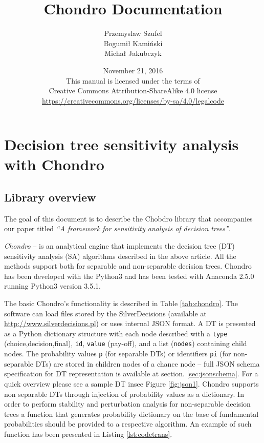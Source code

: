 \documentclass[a4paper,10pt,english]{sphinxmanual}
\title{Chondro Documentation}
\date{November 21, 2016
\\
This manual is licensed under the terms of\\Creative Commons Attribution-ShareAlike 4.0 license\\ \url{https://creativecommons.org/licenses/by-sa/4.0/legalcode}
}
\author{Przemyslaw Szufel \\ Bogumi{\l} Kami\'{n}ski \\ Micha{\l} Jakubczyk }
\begin{document}
	\lstset{language=Python}
	\maketitle

	
\chapter{Decision tree sensitivity analysis with Chondro}

\section{Library overview}
	The goal of this document is to describe the Chobdro library that accompanies our paper titled \emph{``A framework for sensitivity analysis of decision trees''}.

	\emph{Chondro} -- is an analytical engine that implements the decision tree (DT) sensitivity analysis (SA) algorithms described in the above article. All the methods support both for separable and non-separable decision trees. Chondro has been developed with the Python3 and has been tested with Anaconda 2.5.0 running Python3 version 3.5.1. 
	
	The basic Chondro's functionality is described in Table \ref{tab:chondro}. The software can load files stored by the \mbox{SilverDecisions} (available at \url{http://www.silverdecisions.pl}) or uses internal JSON format. A DT is presented as a Python dictionary structure with each node described with a \texttt{type} (choice,decision,final), \texttt{id}, \texttt{value} (pay-off), and a list (\texttt{nodes}) containing child nodes. The probability values \texttt{p} (for separable DTs) or identifiers \texttt{pi} (for non-separable DTs)  are stored in children nodes of a chance node -- full JSON schema specification for DT representation is available at section.  \ref{sec:jsonschema}. For a quick overview please see a sample DT insee Figure \ref{fig:json1}.
	Chondro supports non separable DTs through  injection of probability values as a dictionary. In order to perform stability and perturbation analysis for non-separable decision trees a function that generates probability dictionary on the base of fundamental probabilities should be provided to a respective algorithm. An example of such function has been presented in Listing \ref{lst:codetrans}.
	
\end{document}
